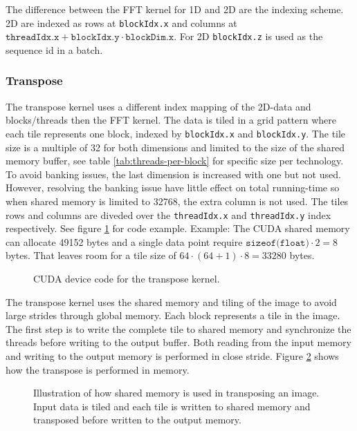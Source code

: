 The difference between the FFT kernel for 1D and 2D are the indexing scheme. 2D are indexed as rows at \texttt{blockIdx.x} and columns at $\texttt{threadIdx.x} + \texttt{blockIdx.y} \cdot \texttt{blockDim.x}$. For 2D \texttt{blockIdx.z} is used as the sequence id in a batch.

\subsubsection{Transpose}

The transpose kernel uses a different index mapping of the 2D-data and blocks/threads then the FFT kernel. The data is tiled in a grid pattern where each tile represents one block, indexed by \texttt{blockIdx.x} and \texttt{blockIdx.y}. The tile size is a multiple of 32 for both dimensions and limited to the size of the shared memory buffer, see table \ref{tab:threads-per-block} for specific size per technology. To avoid banking issues, the last dimension is increased with one but not used. However, resolving the banking issue have little effect on total running-time so when shared memory is limited to 32768, the extra column is not used. The tiles rows and columns are diveded over the \texttt{threadIdx.x} and \texttt{threadIdx.y} index respectively. See figure \ref{lst:cuda:device-transpose} for code example. Example: The CUDA shared memory can allocate 49152 bytes and a single data point require $\texttt{sizeof(float)} \cdot 2 = 8$ bytes. That leaves room for a tile size of $64 \cdot (64 + 1) \cdot 8 = 33280$ bytes.

\begin{figure}[h!]
	\centering
	\begin{framed}
			
	\end{framed}
	\caption{CUDA device code for the transpose kernel.}
	\label{lst:cuda:device-transpose}	
\end{figure}

The transpose kernel uses the shared memory and tiling of the image to avoid large strides through global memory. Each block represents a tile in the image. The first step is to write the complete tile to shared memory and synchronize the threads before writing to the output buffer. Both reading from the input memory and writing to the output memory is performed in close stride. Figure \ref{fig:transpose-memory} shows how the transpose is performed in memory.

\begin{figure}[h!]
	\centering
	
	\caption{Illustration of how shared memory is used in transposing an image. Input data is tiled and each tile is written to shared memory and transposed before written to the output memory. }
	\label{fig:transpose-memory}
\end{figure}

